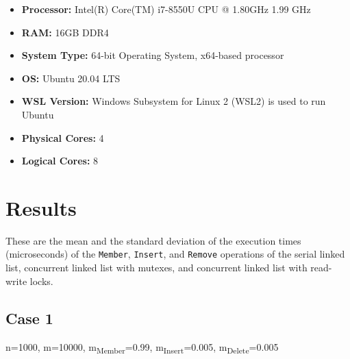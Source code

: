 \documentclass[a4paper,12pt]{article}
\begin{document}
\begin{itemize}
    \itemsep 0em
    \item \textbf{Processor:} Intel(R) Core(TM) i7-8550U CPU @ 1.80GHz   1.99 GHz
    \item \textbf{RAM:} 16GB DDR4
    \item \textbf{System Type:} 64-bit Operating System, x64-based processor
    \item \textbf{OS:} Ubuntu 20.04 LTS
    \item \textbf{WSL Version:} Windows Subsystem for Linux 2 (WSL2) is used to run Ubuntu
    \item \textbf{Physical Cores:} 4
    \item \textbf{Logical Cores:} 8
\end{itemize}

\section{Results}

These are the mean and the standard deviation of the execution times (microseconds) of the
\lstinline|Member|, \lstinline|Insert|, and \lstinline|Remove| operations of
the serial linked list, concurrent linked list with mutexes, and concurrent
linked list with read-write locks.

\subsection{Case 1}

n=1000, m=10000, m\textsubscript{Member}=0.99, m\textsubscript{Insert}=0.005, m\textsubscript{Delete}=0.005
\end{document}
